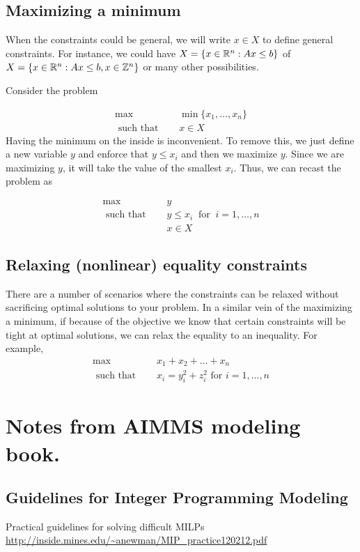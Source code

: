\documentclass[../open-optimization/open-optimization.tex]{subfiles}
\begin{document}
\subsection{Maximizing a minimum}
When the constraints could be general, we will write $x \in X$ to define general constraints.  For instance, we could have $X = \{ x \in {\mathbb{R}}^n : Ax \leq b\}$ of $X  = \{ x \in {\mathbb{R}}^n : Ax \leq b, x \in {\mathbb{Z}}^n\}$ or many other possibilities.  


Consider the problem 

\begin{align*}
\max   \quad & \min \{x_1, \dots, x_n\}\\
\text{ such that } \quad &  x \in X
\end{align*}
Having the minimum on the inside is inconvenient.  To remove this, we just define a new variable $y$ and enforce that $y \leq x_i$ and then we maximize $y$.  Since we are maximizing $y$, it will take the value of the smallest $x_i$.  Thus, we can recast the problem as

\begin{align*}
\max\quad    & y\\
\text{ such that } \quad  & y \leq x_i \ \text{ for }\  i=1, \dots, n \\
&  x \in X
\end{align*}


\subsection{Relaxing (nonlinear) equality constraints}

There are a number of scenarios where the constraints can be relaxed without sacrificing optimal solutions to your problem.   In a similar vein of the maximizing a minimum, if because of the objective we know that certain constraints will be tight at optimal solutions, we can relax the equality to an inequality.   For example, 
\begin{align*}
\max   \quad &x_1 + x_2 +  \dots + x_n\\
\text{ such that } \quad &  x_i = y_i^2 + z_i^2 \text{ for } i=1, \dots, n
\end{align*}






\section{Notes from AIMMS modeling book.}
\subsection{Guidelines for Integer Programming Modeling}
Practical guidelines for solving difficult MILPs
\url{http://inside.mines.edu/~anewman/MIP_practice120212.pdf}
\end{document}
